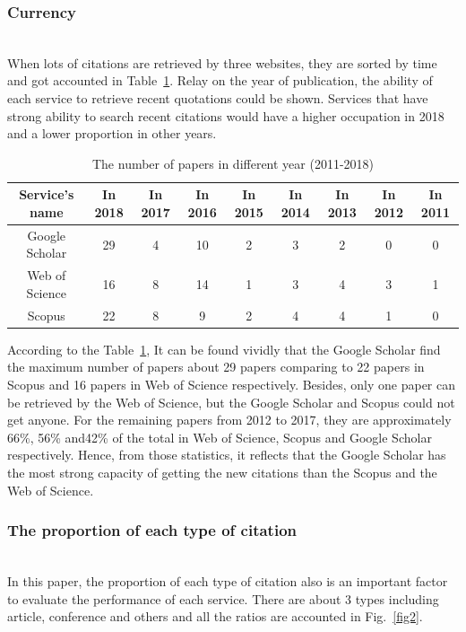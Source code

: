 \documentclass[runningheads]{llncs}
\begin{document}
\subsubsection{Currency}
\par\noindent\\
When lots of citations are retrieved by three websites, they are sorted by time and got accounted in Table~\ref{tab:my_label2}. Relay on the year of publication, the ability of each service to retrieve recent quotations could be shown. Services that have strong ability to search recent citations would have a higher occupation in 2018 and a lower proportion in other years.
\begin{table}
    \setlength{\abovecaptionskip}{10pt}%
    \setlength{\belowcaptionskip}{0pt}%
    \caption{The number of papers in different year (2011-2018)}
    \centering
    \begin{tabular}{|c|c|c|c|c|c|c|c|c|}
    \hline
        Service's name & In 2018 & In 2017& In 2016& In 2015& In 2014& In 2013& In 2012& In 2011  \\
    \hline
         Google Scholar & 29 & 4 & 10 & 2 & 3 & 2 & 0 & 0 \\
    
         Web of Science & 16 & 8 & 14 & 1 & 3 & 4 & 3 & 1\\
    
         Scopus  & 22 & 8 & 9 & 2 & 4 & 4 & 1 & 0\\
    \hline
    \end{tabular}
    
    \label{tab:my_label2}
\end{table}
\par\noindent
According to the Table~\ref{tab:my_label2}, It can be found vividly that the Google Scholar find the maximum number of papers about 29 papers comparing to 22 papers in Scopus and 16 papers in Web of Science respectively. Besides, only one paper can be retrieved by the Web of Science, but the Google Scholar and Scopus could not get anyone. For the remaining papers from 2012 to 2017, they are approximately 66\%, 56\% and42\% of the total in Web of Science, Scopus and Google Scholar respectively. Hence, from those statistics, it reflects that the Google Scholar has the most strong capacity of getting the new citations than the Scopus and the Web of Science.

\subsubsection{The proportion of each type of citation }
\par\noindent\\
In this paper, the proportion of each type of citation also is an important factor to evaluate the performance of each service. There are about 3 types including article, conference and others and all the ratios are accounted in Fig.~\ref{fig2}.
\end{document}
